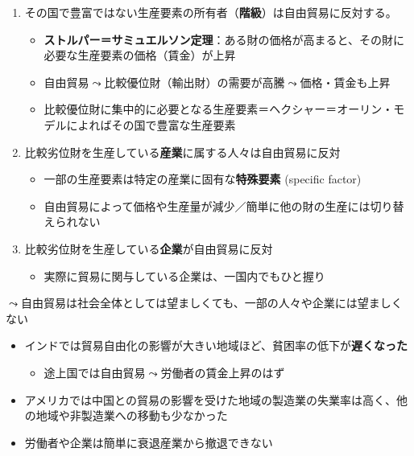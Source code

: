 \documentclass[
  xelatex,
  ja=standard]{bxjsarticle}
\providecommand{\tightlist}{%
  \setlength{\itemsep}{0pt}\setlength{\parskip}{0pt}}\usepackage{longtable,booktabs,array}
\begin{document}
\begin{enumerate}
\def\labelenumi{\arabic{enumi}.}
\tightlist
\item
  その国で豊富ではない生産要素の所有者（\textbf{階級}）は自由貿易に反対する。

  \begin{itemize}
  \tightlist
  \item
    \textbf{ストルパー＝サミュエルソン定理}：ある財の価格が高まると、その財に必要な生産要素の価格（賃金）が上昇
  \item
    自由貿易\(\leadsto\)比較優位財（輸出財）の需要が高騰\(\leadsto\)価格・賃金も上昇
  \item
    比較優位財に集中的に必要となる生産要素＝ヘクシャー＝オーリン・モデルによればその国で豊富な生産要素
  \end{itemize}
\item
  比較劣位財を生産している\textbf{産業}に属する人々は自由貿易に反対\citep{mayda2005}

  \begin{itemize}
  \tightlist
  \item
    一部の生産要素は特定の産業に固有な\textbf{特殊要素} (specific
    factor)
  \item
    自由貿易によって価格や生産量が減少／簡単に他の財の生産には切り替えられない
  \end{itemize}
\item
  比較劣位財を生産している\textbf{企業}が自由貿易に反対

  \begin{itemize}
  \tightlist
  \item
    実際に貿易に関与している企業は、一国内でもひと握り\citep{freund2020}
  \end{itemize}
\end{enumerate}

\(\leadsto\)自由貿易は社会全体としては望ましくても、一部の人々や企業には望ましくない

\begin{itemize}
\tightlist
\item
  インドでは貿易自由化の影響が大きい地域ほど、貧困率の低下が\textbf{遅くなった}\citep{topalova2010}

  \begin{itemize}
  \tightlist
  \item
    途上国では自由貿易\(\leadsto\)労働者の賃金上昇のはず
  \end{itemize}
\item
  アメリカでは中国との貿易の影響を受けた地域の製造業の失業率は高く、他の地域や非製造業への移動も少なかった\citep{autor2013}
\item
  労働者や企業は簡単に衰退産業から撤退できない
\end{itemize}
\end{document}
